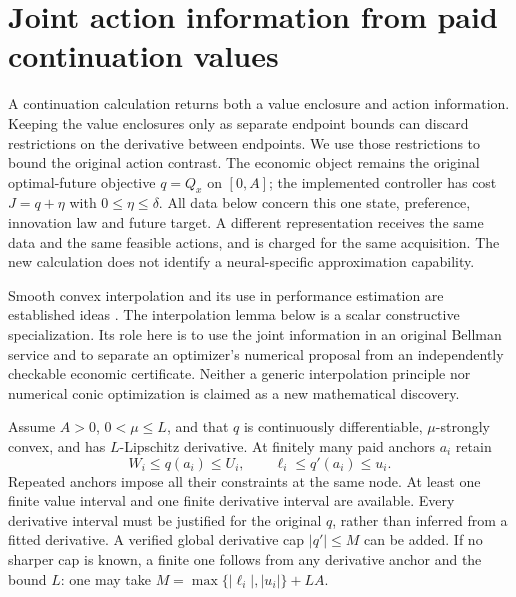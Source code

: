 \section{Joint action information from paid continuation values}
\label{sec:joint124}

A continuation calculation returns both a value enclosure and action
information. Keeping the value enclosures only as separate endpoint bounds
can discard restrictions on the derivative between endpoints. We use those
restrictions to bound the original action contrast. The economic object
remains the original optimal-future objective $q=Q_x$ on $[0,A]$;
the implemented controller has cost $J=q+\eta$ with
$0\le\eta\le\delta$. All data below concern this one state, preference,
innovation law and future target. A different representation receives the
same data and the same feasible actions, and is charged for the same
acquisition. The new calculation does not identify a neural-specific
approximation capability.

Smooth convex interpolation and its use in performance estimation are
established ideas \citep{THG2017Interpolation122}. The interpolation
lemma below is a scalar constructive specialization. Its role here is to
use the joint information in an original Bellman service and to separate
an optimizer's numerical proposal from an independently checkable economic
certificate. Neither a generic interpolation principle nor numerical
conic optimization is claimed as a new mathematical discovery.

Assume $A>0$, $0<\mu\le L$, and that $q$ is continuously differentiable,
$\mu$-strongly convex, and has $L$-Lipschitz derivative. At finitely many
paid anchors $a_i$ retain
\begin{equation}\label{eq:jointdata124}
 W_i\le q(a_i)\le U_i,\qquad
 \ell_i\le q'(a_i)\le u_i.
\end{equation}
Repeated anchors impose all their constraints at the same node. At least
one finite value interval and one finite derivative interval are available.
Every derivative interval must be justified for the original $q$, rather
than inferred from a fitted derivative. A verified global derivative cap
$|q'|\le M$ can be added. If no sharper cap is known, a finite one follows
from any derivative anchor and the bound $L$: one may take
$M=\max\{|\ell_i|,|u_i|\}+LA$.

